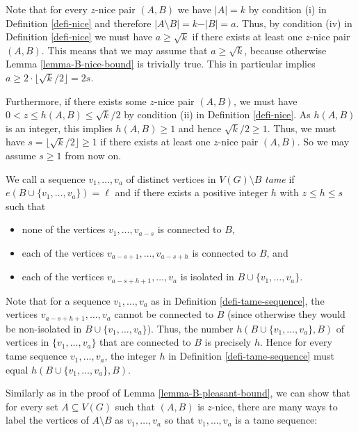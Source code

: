 Note that for every $z$-nice pair $(A,B)$ we have $\vert A\vert=k$ by condition (i) in Definition \ref{defi-nice} and therefore $\vert A\setminus B\vert=k-\vert B\vert=a$. Thus, by condition (iv) in Definition \ref{defi-nice} we must have $a\geq \sqrt{k}$ if there exists at least one $z$-nice pair $(A,B)$. This means that we may assume that $a\geq \sqrt{k}$, because otherwise Lemma \ref{lemma-B-nice-bound} is trivially true. This in particular implies $a\geq 2\cdot\lfloor \sqrt{k}/2\rfloor=2s$.

Furthermore, if there exists some $z$-nice pair $(A,B)$, we must have $0<z\leq h(A,B)\leq \sqrt{k}/2$ by condition (ii) in Definition \ref{defi-nice}. As $h(A,B)$ is an integer, this implies $h(A,B)\geq 1$ and hence $\sqrt{k}/2\geq 1$. Thus, we must have $s=\lfloor \sqrt{k}/2\rfloor\geq 1$ if there exists at least one $z$-nice pair $(A,B)$. So we may assume $s\geq 1$ from now on.

\begin{definition}\label{defi-tame-sequence} We call a sequence $v_1,\dots,v_a$ of distinct vertices in $V(G)\setminus B$ \emph{tame} if $e(B\cup \lbrace v_1,\dots,v_a\rbrace)=\ell$ and if there exists a positive integer $h$ with $z\leq h\leq s$ such that
\begin{itemize}
\item none of the vertices $v_1,\dots,v_{a-s}$ is connected to $B$, 
\item each of the vertices $v_{a-s+1},\dots,v_{a-s+h}$ is connected to $B$, and
\item each of the vertices $v_{a-s+h+1},\dots,v_a$ is isolated in $B\cup \lbrace v_1,\dots,v_a\rbrace$.
\end{itemize}
\end{definition}

Note that for a sequence $v_1,\dots,v_a$ as in Definition \ref{defi-tame-sequence}, the vertices $v_{a-s+h+1},\dots,v_a$ cannot be connected to $B$ (since otherwise they would be non-isolated in $B\cup \lbrace v_1,\dots,v_a\rbrace$). Thus, the number $h(B\cup \lbrace v_1,\dots,v_a\rbrace, B)$ of vertices in $\lbrace v_1,\dots,v_a\rbrace$ that are connected to $B$ is precisely $h$. Hence for every tame sequence $v_1,\dots,v_a$, the integer $h$ in Definition \ref{defi-tame-sequence} must equal $h(B\cup \lbrace v_1,\dots,v_a\rbrace, B)$.

Similarly as in the proof of Lemma \ref{lemma-B-pleasant-bound}, we can show that for every set $A\subseteq V(G)$ such that $(A,B)$ is $z$-nice, there are many ways to label the vertices of $A\setminus B$ as $v_1,\dots,v_a$ so that $v_1,\dots,v_a$ is a tame sequence:

